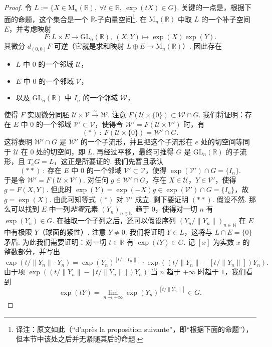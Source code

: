 \begin{proof}
令 $L:=\{X\in\mathrm{M}_n(\mathbb R),\ \forall t\in\mathbb R,\ \exp(tX)\in G\}$. 关键的一点是，根据下面的命题，这个集合是一个 $\mathbb R$-子向量空间\footnote{译注：原文如此（``d'après la proposition suivante''，即``根据下面的命题''），但本节中该处之后并无紧随其后的命题.}.
在 $\mathrm{M}_n(\mathbb R)$ 中取 $L$ 的一个补子空间 $E$，并考虑映射
\[
F:L\times E\longrightarrow\mathrm{GL}_n(\mathbb R),\ (X,Y)\mapsto\exp(X)\exp(Y).
\]
其微分 $d_{(0,0)}F$ 可逆（它就是求和映射 $L\oplus E\longrightarrow\mathrm{M}_n(\mathbb R)$）. 因此存在
\begin{itemize}[label=--]
\item $L$ 中 $0$ 的一个邻域 $\mathcal U$，
\item $E$ 中 $0$ 的一个邻域 $\mathcal V$，
\item 以及 $\mathrm{GL}_n(\mathbb R)$ 中 $I_n$ 的一个邻域 $\mathcal W$，
\end{itemize}
使得 $F$ 实现微分同胚 $\mathcal U\times\mathcal V\stackrel{\sim}{\longrightarrow}\mathcal W$. 注意 $F(\mathcal U\times\{0\})\subset\mathcal W\cap G$.
我们将证明：存在 $E$ 中 $0$ 的一个邻域 $\mathcal V'\subset\mathcal V$，使得令 $\mathcal W'=F(\mathcal U\times\mathcal V')$ 时，有
\[
(*)\ :\ F(\mathcal U\times\{0\})=\mathcal W'\cap G.
\]
这将表明 $\mathcal W'\cap G$ 是 $\mathcal W'$ 的一个子流形，并且把这个子流形在 $e$ 处的切空间等同于 $\mathcal U$ 在 $0$ 处的切空间，即 $L$. 再经过平移，最终可推得 $G$ 是 $\mathrm{GL}_n(\mathbb R)$ 的子流形，且 $T_eG=L$，这正是所要证的.
我们先暂且承认
\[
(**)\ :\ \text{存在 $E$ 中 $0$ 的一个邻域 $\mathcal V'\subset\mathcal V$，使得 $\exp(\mathcal V')\cap G=\{I_n\}$.}
\]
于是令 $\mathcal W'=F(\mathcal U\times\mathcal V')$. 对任何 $g\in\mathcal W'\cap G$，存在 $X\in\mathcal U$，$Y\in\mathcal V'$，使得 $g=F(X,Y)$. 但此时 $\exp(Y)=\exp(-X)g\in\exp(\mathcal V')\cap G=\{I_n\}$，故 $g=\exp(X)$. 由此可知等式 $(*)$ 对 $\mathcal V'$ 成立.
剩下要证明 $(**)$. 假设不然. 那么可以找到 $E$ 中一列\emph{非零}元素 $(Y_n)_{n\in\mathbb N}$ 趋于 $0$，使得对一切 $n$ 有 $\exp(Y_n)\in G$. 在抽取一个子列之后，还可以假设序列 $(Y_n/\|Y_n\|)_{n\in\mathbb N}$ 在 $E$ 中有极限 $Y$（球面的紧性）. 注意 $Y\neq0$. 我们将证明 $Y\in L$，这将与 $L\cap E=\{0\}$ 矛盾. 为此我们需要证明：对一切 $t\in\mathbb R$ 有 $\exp(tY)\in G$. 记 $[x]$ 为实数 $x$ 的整数部分，并写出
\[
\exp(t/\|Y_n\|\cdot Y_n)=\exp(Y_n)^{[t/\|Y_n\|]}\cdot\exp((t/\|Y_n\|- [t/\|Y_n\|])Y_n).
\]
由于项 $\exp((t/\|Y_n\|- [t/\|Y_n\|])Y_n)$ 当 $n$ 趋于 $+\infty$ 时趋于 $1$，我们看到
\[
\exp(tY)=\lim_{n\to+\infty}\exp(Y_n)^{[t/\|Y_n\|]}\in G.
\]
\end{proof}
